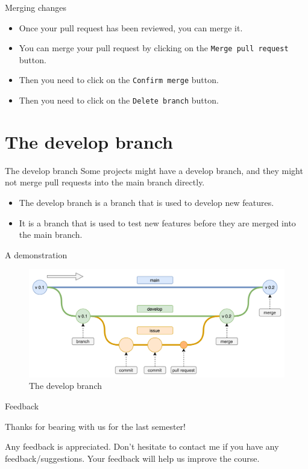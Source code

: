 \documentclass{beamer}
\begin{document}
\begin{frame}{Merging changes}
    \begin{itemize}
        \item Once your pull request has been reviewed, you can merge it.
        \item You can merge your pull request by clicking on the \texttt{Merge pull request} button.
        \item Then you need to click on the \texttt{Confirm merge} button.
        \item Then you need to click on the \texttt{Delete branch} button.
    \end{itemize}
\end{frame}

\section{The develop branch}

\begin{frame}{The develop branch}
    Some projects might have a develop branch, and they might not merge pull requests into the main branch directly.
    \begin{itemize}
        \item The develop branch is a branch that is used to develop new features.
        \item It is a branch that is used to test new features before they are merged into the main branch.
\end{itemize}
\end{frame}

\begin{frame}{A demonstration}
    \begin{figure}
        \includegraphics[width=\textwidth]{develop-branch.png}
        \caption{The develop branch}
    \end{figure}
\end{frame}

\begin{frame}{Feedback}
    \begin{center}
    Thanks for bearing with us for the last semester!
    \end{center}

    Any feedback is appreciated. Don't hesitate to contact me if you have any feedback/suggestions. Your feedback will help us improve the course.
\end{frame}
\end{document}
